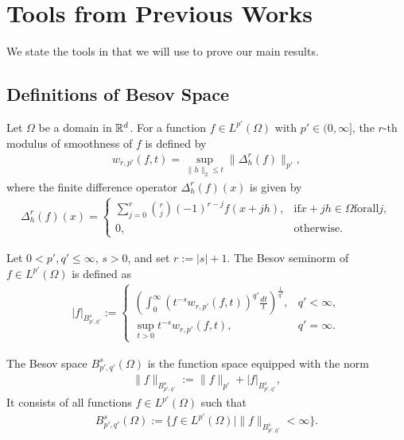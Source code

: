\section{Tools from Previous Works}\label{sec:app:main_theorems}

We state the tools in \cite{fsi+24} that we will use to prove our main results.

\subsection{Definitions of Besov Space}

\begin{definition}
\label{def:modulus_smoothness}
Let $\Omega$ be a domain in $\mathbb{R}^d$. For a function 
$f \in L^{p'}(\Omega)$ with $p' \in (0,\infty]$, 
the $r$-th modulus of smoothness of $f$ is defined by
\begin{align*}
    w_{r, p'}(f,t) = \sup_{\|h\|_2 \leq t} \|\Delta_h^r (f) \|_{p'},
\end{align*}
where the finite difference operator $\Delta_h^r (f)(x)$ is given by
\begin{align*}
    \Delta_h^r (f)(x) =
\begin{cases}
\sum_{j=0}^{r} \binom{r}{j} (-1)^{r-j} f(x + jh), & \mathrm{if } x + jh \in \Omega \mathrm{ for all } j, \\
0, & \mathrm{otherwise}.
\end{cases}
\end{align*}
\end{definition}

\begin{definition}
\label{def:besov_seminorm}
Let $0 < p', q' \leq \infty$, $s > 0$, and set $r := | s | + 1$. The Besov seminorm of $f \in L^{p'}(\Omega)$ is defined as
\begin{align*}
| f |_{B^{s}_{p',q'}} :=
\begin{cases}
\left( \int_0^{\infty} (t^{-s} w_{r, p'}(f,t))^{q'} \frac{dt}{t} \right)^{\frac{1}{q'}}, & q' < \infty, \\
\sup_{t>0} t^{-s} w_{r, p'}(f,t), & q' = \infty.
\end{cases}
\end{align*}
\end{definition}

\begin{definition}
\label{def:besov_space}
The Besov space $B^{s}_{p',q'}(\Omega)$ is the function space equipped with the norm
\begin{align*}
    \| f \|_{B^{s}_{p',q'}} := \| f \|_{p'} + | f |_{B^{s}_{p',q'}},
\end{align*}
It consists of all functions $f \in L^{p'}(\Omega)$ such that
\begin{align*}
    B^{s}_{p',q'}(\Omega) := \{ f \in L^{p'}(\Omega) \mid \| f \|_{B^{s}_{p',q'}} < \infty \}.
\end{align*}
\end{definition}

